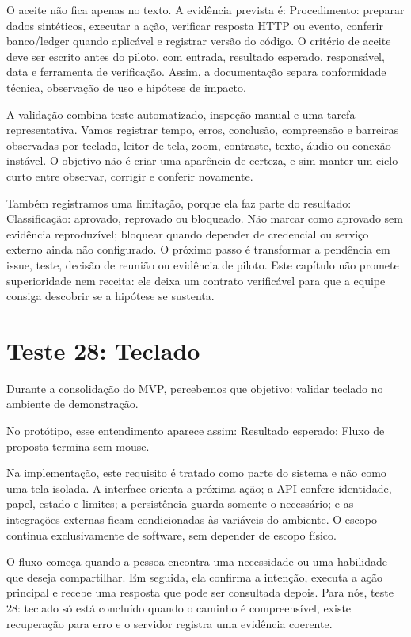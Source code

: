 \documentclass[12pt,oneside,a4paper,article]{abntex2}
\begin{document}
O aceite não fica apenas no texto. A evidência prevista é: Procedimento: preparar dados sintéticos, executar a ação, verificar resposta HTTP ou evento, conferir banco/ledger quando aplicável e registrar versão do código. O critério de aceite deve ser escrito antes do piloto, com entrada, resultado esperado, responsável, data e ferramenta de verificação. Assim, a documentação separa conformidade técnica, observação de uso e hipótese de impacto.

A validação combina teste automatizado, inspeção manual e uma tarefa representativa. Vamos registrar tempo, erros, conclusão, compreensão e barreiras observadas por teclado, leitor de tela, zoom, contraste, texto, áudio ou conexão instável. O objetivo não é criar uma aparência de certeza, e sim manter um ciclo curto entre observar, corrigir e conferir novamente.

Também registramos uma limitação, porque ela faz parte do resultado: Classificação: aprovado, reprovado ou bloqueado. Não marcar como aprovado sem evidência reproduzível; bloquear quando depender de credencial ou serviço externo ainda não configurado. O próximo passo é transformar a pendência em issue, teste, decisão de reunião ou evidência de piloto. Este capítulo não promete superioridade nem receita: ele deixa um contrato verificável para que a equipe consiga descobrir se a hipótese se sustenta.

\section{Teste 28: Teclado}
Durante a consolidação do MVP, percebemos que objetivo: validar teclado no ambiente de demonstração.

No protótipo, esse entendimento aparece assim: Resultado esperado: Fluxo de proposta termina sem mouse.

Na implementação, este requisito é tratado como parte do sistema e não como uma tela isolada. A interface orienta a próxima ação; a API confere identidade, papel, estado e limites; a persistência guarda somente o necessário; e as integrações externas ficam condicionadas às variáveis do ambiente. O escopo continua exclusivamente de software, sem depender de escopo físico.

O fluxo começa quando a pessoa encontra uma necessidade ou uma habilidade que deseja compartilhar. Em seguida, ela confirma a intenção, executa a ação principal e recebe uma resposta que pode ser consultada depois. Para nós, teste 28: teclado só está concluído quando o caminho é compreensível, existe recuperação para erro e o servidor registra uma evidência coerente.
\end{document}
